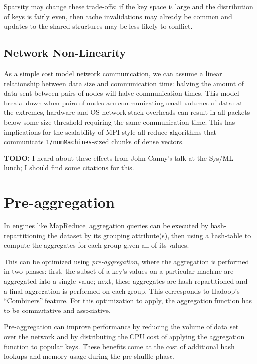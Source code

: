 \documentclass[12pt]{article}
\begin{document}
Sparsity may change these trade-offs: if the key space is large and the
distribution of keys is fairly even, then cache invalidations may already be
common and updates to the shared structures may be less likely to conflict.

\subsection{Network Non-Linearity}

As a simple cost model network communication, we can assume a linear relationship between data size and communication time: halving the amount of data sent between pairs of nodes will halve communication times.
This model breaks down when pairs of nodes are communicating small volumes of data: at the extremes, hardware and OS network stack overheads can result in all packets below some size threshold requiring the same communication time.
This has implications for the scalability of MPI-style all-reduce algorithms that communicate \texttt{1/numMachines}-sized chunks of dense vectors.

\textbf{TODO:} I heard about these effects from John Canny's talk at the Sys/ML lunch; I should find some citations for this.

\section{Pre-aggregation}

In engines like MapReduce, aggregation queries can be executed by
hash-repartitioning the dataset by its grouping attribute(s), then using
a hash-table to compute the aggregates for each group given all of its values.

This can be optimized using \emph{pre-aggregation}, where the aggregation is
performed in two phases: first, the subset of a key's values on a particular
machine are aggregated into a single value; next, these aggregates are
hash-repartitioned and a final aggregation is performed on each group.
This corresponds to Hadoop's ``Combiners'' feature.
For this optimization to apply, the aggregation function has to be commutative
and associative.

Pre-aggregation can improve performance by reducing the volume of data set
over the network and by distributing the CPU cost of applying the aggregation
function to popular keys.
These benefits come at the cost of additional hash lookups and memory usage
during the pre-shuffle phase.
\end{document}
